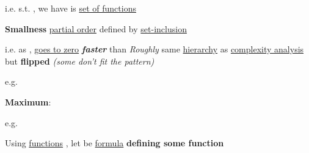 \begin{itemize}
      \vItem
            i.e.  s.t. \iMbox{\forall \epsilon}, we have
      \vItem
             is \underline{set of functions}
\end{itemize}

\hSep %

\textbf{Smallness} \underline{partial order} 
defined by \underline{set-inclusion} 

\begin{itemize}

      \vItem
            i.e. as ,  \underline{goes to zero}
            \textbf{\emph{faster}} than 
      \vItem
            \emph{Roughly} same \underline{hierarchy} as \underline{complexity analysis} but
            \textbf{flipped} \emph{(some don't fit the pattern)}

            \begin{itemize}
                  \vItem e.g. 
            \end{itemize}
      \vItem
            \textbf{Maximum}:

            \begin{itemize}
                  \vItem e.g. 
            \end{itemize}
\end{itemize}

\hSep %

Using \underline{functions} , let 
be \underline{formula} \textbf{defining some function}

